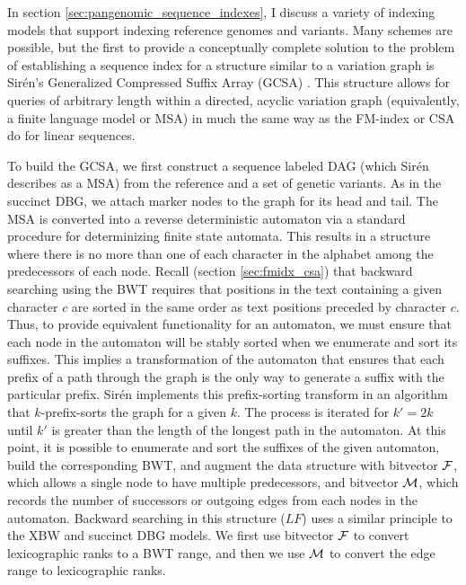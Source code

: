 In section \ref{sec:pangenomic_sequence_indexes}, I discuss a variety of indexing models that support indexing reference genomes and variants.
Many schemes are possible, but the first to provide a conceptually complete solution to the problem of establishing a sequence index for a structure similar to a variation graph is Sir\'{e}n's Generalized Compressed Suffix Array (GCSA) \cite{siren2014indexing}.
This structure allows for queries of arbitrary length within a directed, acyclic variation graph (equivalently, a finite language model or MSA) in much the same way as the FM-index or CSA do for linear sequences.

To build the GCSA, we first construct a sequence labeled DAG (which Sir\'{e}n describes as a MSA) from the reference and a set of genetic variants.
As in the succinct DBG, we attach marker nodes to the graph for its head and tail.
The MSA is converted into a reverse deterministic automaton via a standard procedure for determinizing finite state automata.
This results in a structure where there is no more than one of each character in the alphabet among the predecessors of each node.
Recall (section \ref{sec:fmidx_csa}) that backward searching using the BWT requires that positions in the text containing a given character $c$ are sorted in the same order as text positions preceded by character $c$.
Thus, to provide equivalent functionality for an automaton, we must ensure that each node in the automaton will be stably sorted when we enumerate and sort its suffixes.
This implies a transformation of the automaton that ensures that each prefix of a path through the graph is the only way to generate a suffix with the particular prefix.
Sir\'{e}n implements this prefix-sorting transform in an algorithm that $k$-prefix-sorts the graph for a given $k$.
The process is iterated for $k' = 2k$ until $k'$ is greater than the length of the longest path in the automaton.
At this point, it is possible to enumerate and sort the suffixes of the given automaton, build the corresponding BWT, and augment the data structure with bitvector ${\cal F}$, which allows a single node to have multiple predecessors, and bitvector ${\cal M}$, which records the number of successors or outgoing edges from each nodes in the automaton.
Backward searching in this structure ($LF$) uses a similar principle to the XBW and succinct DBG models.
We first use bitvector ${\cal F}$ to convert lexicographic ranks to a BWT range, and then we use ${\cal M}$ to convert the edge range to lexicographic ranks.


